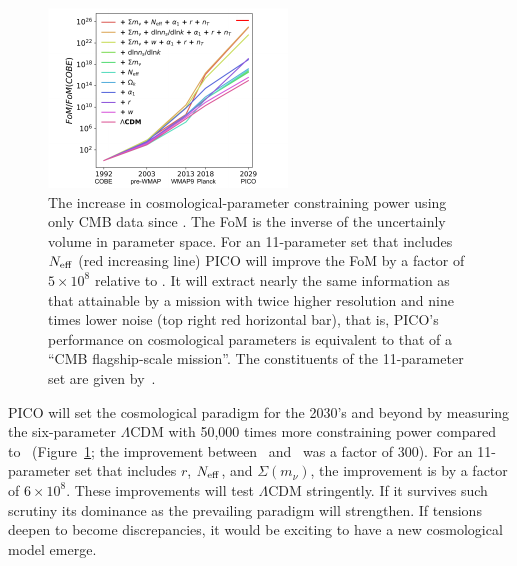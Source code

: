 \documentclass[PICOAPC.tex]{subfiles}
\begin{document}
\begin{figure}[h]
\hspace{-0.2in}
\parbox{2.6in}{\centerline {
\includegraphics[width=2.5in]{images/fom_plot_CVL+del.pdf} } }
\hspace{-0.17in}
\parbox{4.1in}{
\caption{\captiontext 
The increase in cosmological-parameter constraining power using only CMB data since \cobe . The FoM is the inverse of the uncertainly volume in parameter space. 
For an 11-parameter set that includes ${N_{\rm eff}}$ (red increasing line) PICO will improve the FoM by a factor of $5\times10^{8}$ relative to \planck . It will extract nearly the same information as that attainable by a mission with twice higher resolution and nine times lower noise (top right red horizontal bar), that is, PICO's performance on cosmological parameters is equivalent to that of a ``CMB flagship-scale mission''. The constituents of the 11-parameter set are given by~\citet{pico_report}. 
\label{fig:fom} } }
\vspace{-0.1in}
\end{figure}

PICO will set the cosmological paradigm for the 2030's and beyond by measuring the six-parameter $\Lambda$CDM with 50,000 times more constraining power compared to \planck\ (Figure~\ref{fig:fom}; the improvement between \wmap\ and \planck\ was a factor of 300). For an 11-parameter set that includes $r$, ${N_{\rm eff}}$, and $\Sigma (m_{\nu})$, the improvement is by a factor of $6\times10^{8}$. These improvements will test $\Lambda$CDM stringently. If it survives such scrutiny its dominance as the prevailing paradigm will strengthen. If tensions deepen to become discrepancies, it would be exciting to have a new cosmological model emerge. 
\end{document}
